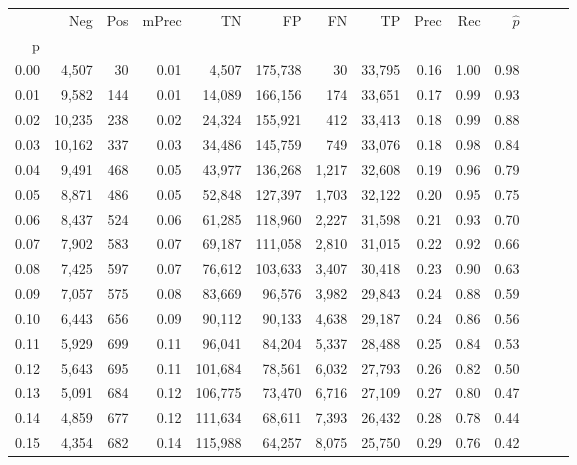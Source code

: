 \begin{tabular}{rrrrrrrrrrrrrr}
\toprule
{} &     Neg &  Pos & mPrec &       TN &       FP &      FN &      TP &  Prec &   Rec & $\hat{p}$ \\
p    &         &      &       &          &          &         &         &       &       &           \\
\midrule
0.00 &   4,507 &   30 &  0.01 &    4,507 &  175,738 &      30 &  33,795 &  0.16 &  1.00 &      0.98 \\
0.01 &   9,582 &  144 &  0.01 &   14,089 &  166,156 &     174 &  33,651 &  0.17 &  0.99 &      0.93 \\
0.02 &  10,235 &  238 &  0.02 &   24,324 &  155,921 &     412 &  33,413 &  0.18 &  0.99 &      0.88 \\
0.03 &  10,162 &  337 &  0.03 &   34,486 &  145,759 &     749 &  33,076 &  0.18 &  0.98 &      0.84 \\
0.04 &   9,491 &  468 &  0.05 &   43,977 &  136,268 &   1,217 &  32,608 &  0.19 &  0.96 &      0.79 \\
0.05 &   8,871 &  486 &  0.05 &   52,848 &  127,397 &   1,703 &  32,122 &  0.20 &  0.95 &      0.75 \\
0.06 &   8,437 &  524 &  0.06 &   61,285 &  118,960 &   2,227 &  31,598 &  0.21 &  0.93 &      0.70 \\
0.07 &   7,902 &  583 &  0.07 &   69,187 &  111,058 &   2,810 &  31,015 &  0.22 &  0.92 &      0.66 \\
0.08 &   7,425 &  597 &  0.07 &   76,612 &  103,633 &   3,407 &  30,418 &  0.23 &  0.90 &      0.63 \\
0.09 &   7,057 &  575 &  0.08 &   83,669 &   96,576 &   3,982 &  29,843 &  0.24 &  0.88 &      0.59 \\
0.10 &   6,443 &  656 &  0.09 &   90,112 &   90,133 &   4,638 &  29,187 &  0.24 &  0.86 &      0.56 \\
0.11 &   5,929 &  699 &  0.11 &   96,041 &   84,204 &   5,337 &  28,488 &  0.25 &  0.84 &      0.53 \\
0.12 &   5,643 &  695 &  0.11 &  101,684 &   78,561 &   6,032 &  27,793 &  0.26 &  0.82 &      0.50 \\
0.13 &   5,091 &  684 &  0.12 &  106,775 &   73,470 &   6,716 &  27,109 &  0.27 &  0.80 &      0.47 \\
0.14 &   4,859 &  677 &  0.12 &  111,634 &   68,611 &   7,393 &  26,432 &  0.28 &  0.78 &      0.44 \\
0.15 &   4,354 &  682 &  0.14 &  115,988 &   64,257 &   8,075 &  25,750 &  0.29 &  0.76 &      0.42 \\

\end{tabular}
